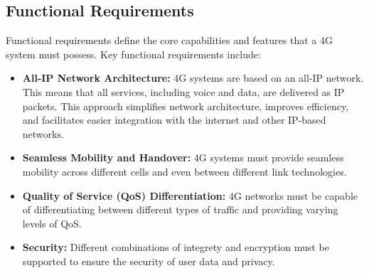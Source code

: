 \subsection{Functional Requirements}

Functional requirements define the core capabilities and features that a 4G system must possess. Key functional requirements include:

\begin{itemize}
    \item \textbf{All-IP Network Architecture:} 4G systems are based on an all-IP network. This means that all services, including voice and data, are delivered as IP packets. This approach simplifies network architecture, improves efficiency, and facilitates easier integration with the internet and other IP-based networks.
    \item \textbf{Seamless Mobility and Handover:} 4G systems must provide seamless mobility across different cells and even between different link technologies.
    \item \textbf{Quality of Service (QoS) Differentiation:} 4G networks must be capable of differentiating between different types of traffic and providing varying levels of QoS.
    \item \textbf{Security:} Different combinations of integrety and encryption must be supported to ensure the security of user data and privacy.
\end{itemize}